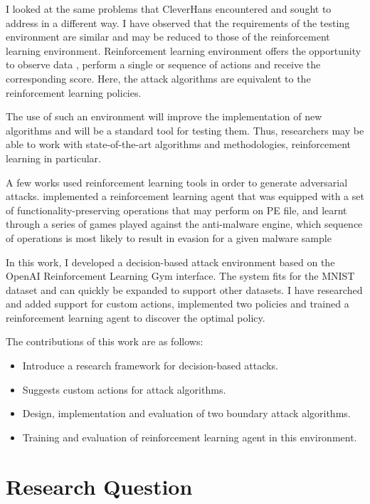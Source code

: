 \documentclass{article}
\begin{document}
I looked at the same problems that CleverHans encountered and sought to address in a different way. I have observed that the requirements of the testing environment are similar and may be reduced to those of the reinforcement learning environment.
Reinforcement learning environment offers the opportunity to observe data , perform a single or sequence of actions and receive the corresponding score. Here, the attack algorithms are equivalent to the reinforcement learning policies.

The use of such an environment will improve the implementation of new algorithms and will be a standard tool for testing them. Thus, researchers may be able to work with state-of-the-art algorithms and methodologies, reinforcement learning in particular.

A few works used reinforcement learning tools in order to generate adversarial attacks. \cite{hyrum2017evading} implemented a reinforcement learning agent that was equipped with a set of functionality-preserving operations that  may perform on PE file, and learnt through a series of games played against the anti-malware engine, which
sequence of operations is most likely to result in evasion for a given malware sample

In this work, I developed a decision-based attack environment based on the OpenAI Reinforcement Learning Gym \cite{brockman2016openai} interface. The system fits for the MNIST dataset \cite{mnist10027939599} and can quickly be expanded to support other datasets. I have researched and added support for custom actions, implemented two policies and trained a reinforcement learning agent to discover the optimal policy.

The contributions of this work are as follows:
\begin{itemize}
\item Introduce a research framework for decision-based attacks. 
\item Suggests custom actions for attack algorithms.
\item Design, implementation and evaluation of two boundary attack algorithms.
\item Training and evaluation of reinforcement learning agent in this environment.
\end{itemize}

\section{Research Question}
\end{document}
